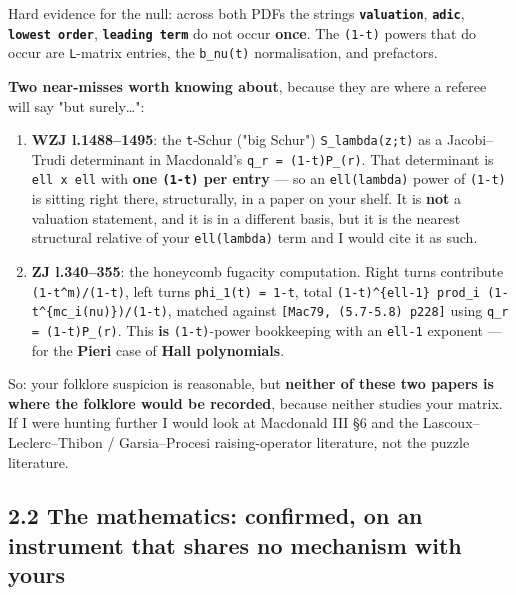 \documentclass[11pt,a4paper]{article}
\begin{document}
Hard evidence for the null: across both PDFs the strings \textbf{\mbox{\texttt{valuation}}}, \textbf{\mbox{\texttt{adic}}}, \textbf{\mbox{\texttt{lowest order}}}, \textbf{\mbox{\texttt{leading term}}} do not occur \textbf{once}. The \mbox{\texttt{(1-t)}} powers that do occur are \mbox{\texttt{L}}-matrix entries, the \mbox{\texttt{b\_nu(t)}} normalisation, and prefactors.

\textbf{Two near-misses worth knowing about}, because they are where a referee will say "but surely\dots{}":

\begin{enumerate}
\item \textbf{WZJ l.1488--1495}: the \mbox{\texttt{t}}-Schur ("big Schur") \mbox{\texttt{S\_lambda(z;t)}} as a Jacobi--Trudi determinant in Macdonald's \mbox{\texttt{q\_r = (1-t)P\_(r)}}. That determinant is \mbox{\texttt{ell x ell}} with \textbf{one \mbox{\texttt{(1-t)}} per entry} --- so an \mbox{\texttt{ell(lambda)}} power of \mbox{\texttt{(1-t)}} is sitting right there, structurally, in a paper on your shelf. It is \textbf{not} a valuation statement, and it is in a different basis, but it is the nearest structural relative of your \mbox{\texttt{ell(lambda)}} term and I would cite it as such.
\item \textbf{ZJ l.340--355}: the honeycomb fugacity computation. Right turns contribute \mbox{\texttt{(1-t\textasciicircum{}m)/(1-t)}}, left turns \mbox{\texttt{phi\_1(t) = 1-t}}, total \mbox{\texttt{(1-t)\textasciicircum{}\{ell-1\} prod\_i (1-t\textasciicircum{}\{mc\_i(nu)\})/(1-t)}}, matched against \mbox{\texttt{[Mac79, (5.7-5.8) p228]}} using \mbox{\texttt{q\_r = (1-t)P\_(r)}}. This \textbf{is} \mbox{\texttt{(1-t)}}-power bookkeeping with an \mbox{\texttt{ell-1}} exponent --- for the \textbf{Pieri} case of \textbf{Hall polynomials}.
\end{enumerate}

So: your folklore suspicion is reasonable, but \textbf{neither of these two papers is where the folklore would be recorded}, because neither studies your matrix. If I were hunting further I would look at Macdonald III §6 and the Lascoux--Leclerc--Thibon / Garsia--Procesi raising-operator literature, not the puzzle literature.

\subsection*{2.2 The mathematics: confirmed, on an instrument that shares no mechanism with yours}
\end{document}
